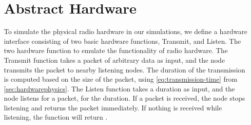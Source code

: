 \section{Abstract Hardware}\label{sec:interface}
To simulate the physical radio hardware in our simulations, we define a hardware interface consisting of two
basic hardware functions, Transmit, and Listen. The two hardware function to emulate the functionality of
radio hardware. The Transmit function takes a packet of arbitrary data as input, and the node transmits the
packet to nearby listening nodes. The duration of the transmission is computed based on the size of the
packet, using \autoref{eq:transmission-time} from \autoref{sec:hardwarephysics}. The Listen function takes a
duration as input, and the node listens for a packet, for the duration. If a packet is received, the node
stops listening and returns the packet immediately. If nothing is received while listening, the function will
return \KwNull. 

%





